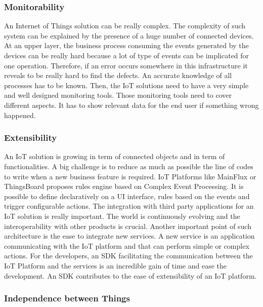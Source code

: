 \documentclass[11pt]{article}
\begin{document}
\subsubsection{Monitorability}

An Internet of Things solution can be really complex. The complexity of such system can be explained by the presence of a huge number of connected devices. At an upper layer, the business process consuming the events generated by the devices can be really hard because a lot of type of events can be implicated for one operation. Therefore, if an error occurs somewhere in this infrastructure it reveals to be really hard to find the defects. An accurate knowledge of all processes has to be known. Then, the IoT solutions need to have a very simple and well designed monitoring tools. Those monitoring tools need to cover different aspects. It has to show relevant data for the end user if something wrong happened. 

\subsubsection{Extensibility}

An IoT solution is growing in term of connected objects and in term of functionalities. A big challenge is to reduce as much as possible the line of codes to write when a new business feature is required. IoT Platforms like MainFlux \cite{Unified-IoT-Platform-Architecture} or ThingsBoard proposes rules engine based on Complex Event Processing. It is possible to define declaratively on a UI interface, rules based on the events and trigger configurable actions. \cite{Performance-Evaluation-Of-Open-Source-IoT-Platforms} The integration with third party applications for an IoT solution is really important. The world is continuously evolving and the interoperability with other products is crucial. 
\newline
\newline
Another important point of such architecture is the ease to integrate new services. A new service is an application communicating with the IoT platform and that can perform simple or complex actions. For the developers, an SDK facilitating the communication between the IoT Platform and the services is an incredible gain of time and ease the development. An SDK contributes to the ease of extensibility of an IoT platform. 

\subsubsection{Independence between Things}
\end{document}
